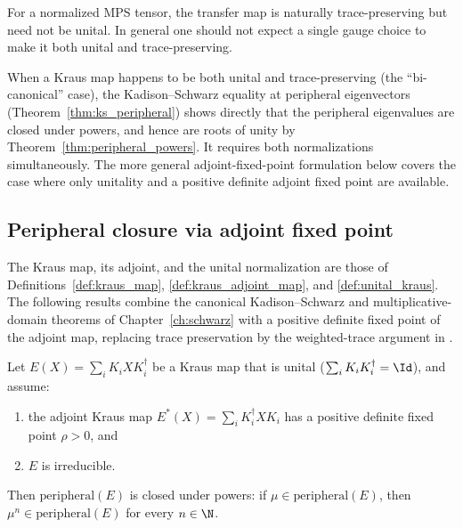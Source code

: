 For a normalized MPS tensor, the transfer map is naturally trace-preserving but need
not be unital. In general one should not expect a single gauge choice to make it
both unital and trace-preserving.

\begin{remark}\label{rem:bicanonical_special_case}\leanok
    When a Kraus map happens to be both unital and trace-preserving
    (the ``bi-canonical'' case), the Kadison--Schwarz equality at peripheral
    eigenvectors (Theorem~\ref{thm:ks_peripheral}) shows directly that the
    peripheral eigenvalues are closed under powers, and hence are roots of unity
    by Theorem~\ref{thm:peripheral_powers}. It
    requires both normalizations simultaneously. The more general adjoint-fixed-point
    formulation below covers the case where only unitality and a positive definite
    adjoint fixed point are available.
\end{remark}

\subsection{Peripheral closure via adjoint fixed point}%
\label{subsec:peripheral_closure_fixedpoint}

The Kraus map, its adjoint, and the unital normalization are those of
Definitions~\ref{def:kraus_map}, \ref{def:kraus_adjoint_map}, and
\ref{def:unital_kraus}. The following results combine the canonical
Kadison--Schwarz and multiplicative-domain theorems of Chapter~\ref{ch:schwarz}
with a positive definite fixed point of the adjoint map, replacing trace
preservation by the weighted-trace argument in
\cite[Appendix~A]{Cirac2016MPDO_arXiv}.

\begin{lemma}%
    \label{lem:peripheral_closed_powers_irred_fp}
    \leanok
    Let $E(X)=\sum_iK_iXK_i^\dagger$ be a Kraus map that is
    unital ($\sum_iK_iK_i^\dagger=\Id$), and assume:
    \begin{enumerate}
        \item the adjoint Kraus map $E^*(X)=\sum_iK_i^\dagger XK_i$
              has a positive definite fixed point $\rho>0$, and
        \item $E$ is irreducible.
    \end{enumerate}
    Then $\mathrm{peripheral}(E)$ is closed under powers:
    if $\mu\in\mathrm{peripheral}(E)$, then
    $\mu^n\in\mathrm{peripheral}(E)$ for every $n\in\N$.
\end{lemma}

